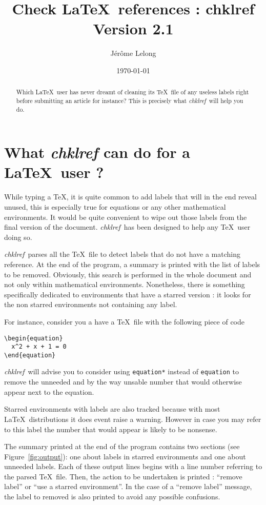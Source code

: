 \documentclass[a4paper,11pt,twoside]{article}
\title{Check \LaTeX\ references : chklref \\
Version 2.1}
\date{\today}
\author{J\'er\^ome Lelong}
\def\chk{{\it chklref}}
\def\page{}%
\def\page{\HCode{<div id='page'>}}%
\begin{document}
\page
\maketitle

\begin{abstract} Which \LaTeX\ user has never dreamt of cleaning its \TeX\ file
  of any useless labels right before submitting an article for instance? This is
  precisely what \chk\ will help you do.
\end{abstract}

\section{What {\it chklref} can do for a \LaTeX\ user ?}

While typing a \TeX, it is quite common to add labels that will in the end
reveal unused, this is especially true for equations or any other mathematical
environments. It would be quite convenient to wipe out those labels from the
final version of the document. \chk\ has been designed to help any \TeX\
user doing so.

\chk\ parses all the \TeX\ file to detect labels that do not have a matching
reference. At the end of the program, a summary is printed with the list of
labels to be removed. Obviously, this search is performed in the whole document
and not only within mathematical environments. Nonetheless, there is something
specifically dedicated to environments that have a starred version : it looks
for the non starred environments not containing any label.

For instance, consider you a have a \TeX\ file with the following piece of code
\begin{verbatim}
\begin{equation}
  x^2 + x + 1 = 0
\end{equation}
\end{verbatim}
\chk\ will advise you to consider using \verb!equation*! instead of
\verb!equation! to remove the unneeded and by the way unsable number that would
otherwise appear next to the equation.

Starred environments with labels are also tracked because with most \LaTeX\
distributions it does event raise a warning. However in case you may refer to
this label the number that would appear is likely to be nonsense.

The summary printed at the end of the program contains two sections (see
Figure~\ref{fig:output}): one about labels in starred environments and one about
unneeded labels. Each of these output lines begins with a line number referring
to the parsed \TeX\ file. Then, the action to be undertaken is printed :
``remove label'' or ``use a starred environment''. In the case of a ``remove
label'' message, the label to removed is also printed to avoid any possible
confusions.
\end{document}
